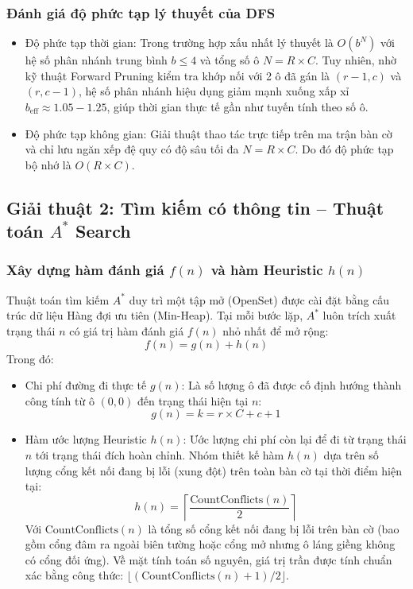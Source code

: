 \documentclass[a4paper]{article}
\begin{document}
\subsubsection{Đánh giá độ phức tạp lý thuyết của DFS}
\begin{itemize}
    \item Độ phức tạp thời gian: Trong trường hợp xấu nhất lý thuyết là $O(b^{N})$ với hệ số phân nhánh trung bình $b \le 4$ và tổng số ô $N = R \times C$. Tuy nhiên, nhờ kỹ thuật Forward Pruning kiểm tra khớp nối với 2 ô đã gán là $(r-1, c)$ và $(r, c-1)$, hệ số phân nhánh hiệu dụng giảm mạnh xuống xấp xỉ $b_{\text{eff}} \approx 1.05 - 1.25$, giúp thời gian thực tế gần như tuyến tính theo số ô.
    \item Độ phức tạp không gian: Giải thuật thao tác trực tiếp trên ma trận bàn cờ và chỉ lưu ngăn xếp đệ quy có độ sâu tối đa $N = R \times C$. Do đó độ phức tạp bộ nhớ là $O(R \times C)$.
\end{itemize}

\subsection{Giải thuật 2: Tìm kiếm có thông tin -- Thuật toán \texorpdfstring{$A^*$}{A*} Search}
\subsubsection{Xây dựng hàm đánh giá \texorpdfstring{$f(n)$}{f(n)} và hàm Heuristic \texorpdfstring{$h(n)$}{h(n)}}
Thuật toán tìm kiếm $A^*$ duy trì một tập mở ($\text{OpenSet}$) được cài đặt bằng cấu trúc dữ liệu Hàng đợi ưu tiên (Min-Heap). Tại mỗi bước lặp, $A^*$ luôn trích xuất trạng thái $n$ có giá trị hàm đánh giá $f(n)$ nhỏ nhất để mở rộng:
\begin{equation}
    f(n) = g(n) + h(n)
\end{equation}
Trong đó:
\begin{itemize}
    \item Chi phí đường đi thực tế $g(n)$: Là số lượng ô đã được cố định hướng thành công tính từ ô $(0, 0)$ đến trạng thái hiện tại $n$:
    \begin{equation}
        g(n) = k = r \times C + c + 1
    \end{equation}
    \item Hàm ước lượng Heuristic $h(n)$: Ước lượng chi phí còn lại để đi từ trạng thái $n$ tới trạng thái đích hoàn chỉnh. Nhóm thiết kế hàm $h(n)$ dựa trên số lượng cổng kết nối đang bị lỗi (xung đột) trên toàn bàn cờ tại thời điểm hiện tại:
    \begin{equation}
        h(n) = \left\lceil \frac{\text{CountConflicts}(n)}{2} \right\rceil
    \end{equation}
    Với $\text{CountConflicts}(n)$ là tổng số cổng kết nối đang bị lỗi trên bàn cờ (bao gồm cổng đâm ra ngoài biên tường hoặc cổng mở nhưng ô láng giềng không có cổng đối ứng). Về mặt tính toán số nguyên, giá trị trần được tính chuẩn xác bằng công thức: $\lfloor (\text{CountConflicts}(n) + 1) / 2 \rfloor$.
\end{itemize}
\end{document}
